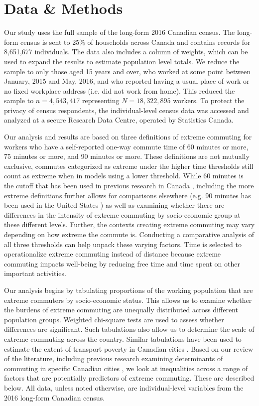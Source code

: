 \documentclass[10 pt,letterpaper]{article}
\begin{document}
\section{Data \& Methods}

Our study uses the full sample of the long-form 2016 Canadian census. The long-form census is sent to 25\% of households across Canada and contains records for 8,651,677 individuals. The data also includes a column of weights, which can be used to expand the results to estimate population level totals. We reduce the sample to only those aged 15 years and over, who worked at some point between January, 2015 and May, 2016, and who reported having a usual place of work or no fixed workplace address (i.e. did not work from home). This reduced the sample to $n = 4,543,417$ representing $N = 18,322,895$ workers. To protect the privacy of census respondents, the individual-level census data was accessed and analyzed at a secure Research Data Centre, operated by Statistics Canada.

Our analysis and results are based on three definitions of extreme commuting for workers who have a self-reported one-way commute time of 60 minutes or more, 75 minutes or more, and 90 minutes or more.  These definitions are not mutually exclusive, commutes categorized as extreme under the higher time thresholds still count as extreme when in models using a lower threshold. While 60 minutes is the cutoff that has been used in previous research in Canada \cite{government_of_canada_daily_2019}, including the more extreme definitions further allows for comparisons elsewhere (e.g. 90 minutes has been used in the United States \cite{marion_comparison_2007,bai_exploring_2020}) as well as examining whether there are differences in the intensity of extreme commuting by socio-economic group at these different levels.  Further, the contexts creating extreme commuting may vary depending on how extreme the commute is. Conducting a comparative analysis of all three thresholds can help unpack these varying factors. Time is selected to operationalize extreme commuting instead of distance because extreme commuting impacts well-being by reducing free time and time spent on other important activities. 

Our analysis begins by tabulating proportions of the working population that are extreme commuters by socio-economic status. This allows us to examine whether the burdens of extreme commuting are unequally distributed across different population groups. Weighted chi-square tests are used to assess whether differences are significant. Such tabulations also allow us to determine the scale of extreme commuting across the country. Similar tabulations have been used to estimate the extent of transport poverty in Canadian cities \cite{allen_sizing_2019}. Based on our review of the literature, including previous research examining determinants of commuting in specific Canadian cities \cite{maoh_determinants_2012-1,newbold_immigrant_2017,cui_accessibility_2019}, we look at inequalities across a range of factors that are potentially predictors of extreme commuting. These are described below. All data, unless noted otherwise, are individual-level variables from the 2016 long-form Canadian census. 
\end{document}
